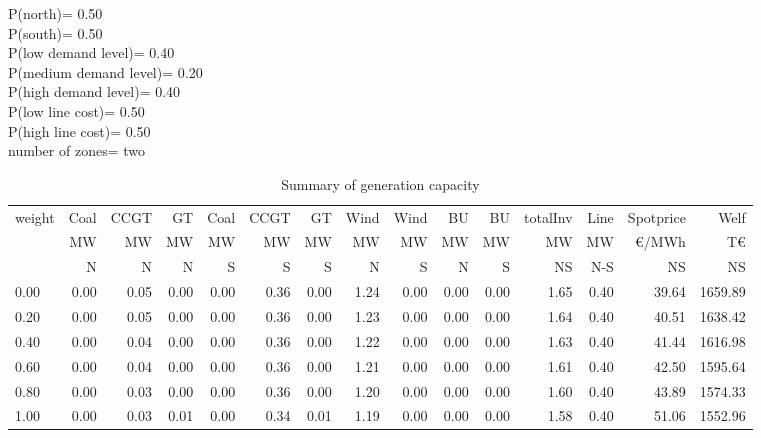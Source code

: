 \documentclass[landscape]{article}
\begin{document}
P(north)=         0.50\\
P(south)=         0.50\\
P(low demand level)=         0.40\\
P(medium demand level)=         0.20\\
P(high demand level)=         0.40\\
P(low line cost)=         0.50\\
P(high line cost)=         0.50\\
number of zones= two\\
\begin{table}[htb]\caption{Summary of generation capacity}
\begin{tabular}{l|rrrrrr|rr|rr|rr|rr}
\toprule
 weight &    Coal &     CCGT &      GT &   Coal  &   CCGT &      GT &    Wind &    Wind  &  BU  &  BU  & totalInv  &    Line   &  Spotprice   &  Welf   \\
        &      MW &       MW &      MW &      MW &     MW &      MW &      MW &      MW  &  MW  &  MW  &    MW     &    MW     &  \euro/MWh &  T\euro   \\
        &       N &       N  &      N  &      S  &      S &       S &       N &       S  &  N   &  S   &    NS     &    N-S    &  NS      &   NS    \\
\midrule
        0.00&        0.00&        0.05&        0.00&        0.00&        0.36&        0.00&        1.24&        0.00&        0.00&        0.00&        1.65&        0.40&       39.64&     1659.89\\
        0.20&        0.00&        0.05&        0.00&        0.00&        0.36&        0.00&        1.23&        0.00&        0.00&        0.00&        1.64&        0.40&       40.51&     1638.42\\
        0.40&        0.00&        0.04&        0.00&        0.00&        0.36&        0.00&        1.22&        0.00&        0.00&        0.00&        1.63&        0.40&       41.44&     1616.98\\
        0.60&        0.00&        0.04&        0.00&        0.00&        0.36&        0.00&        1.21&        0.00&        0.00&        0.00&        1.61&        0.40&       42.50&     1595.64\\
        0.80&        0.00&        0.03&        0.00&        0.00&        0.36&        0.00&        1.20&        0.00&        0.00&        0.00&        1.60&        0.40&       43.89&     1574.33\\
        1.00&        0.00&        0.03&        0.01&        0.00&        0.34&        0.01&        1.19&        0.00&        0.00&        0.00&        1.58&        0.40&       51.06&     1552.96\\
\bottomrule
\end{tabular}
\end{table}
\end{document}
